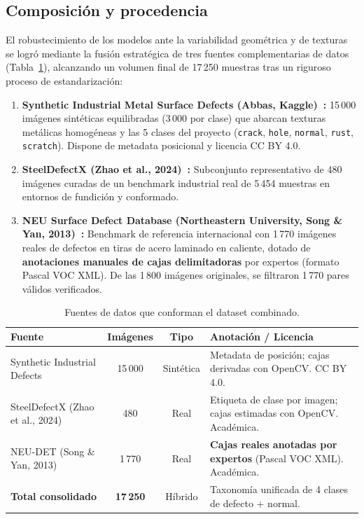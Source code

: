 \documentclass[11pt,a4paper]{article}
\begin{document}
\subsection{Composición y procedencia}
El robustecimiento de los modelos ante la variabilidad geométrica y de texturas se
logró mediante la fusión estratégica de tres fuentes complementarias de datos
(Tabla~\ref{tab:datasets}), alcanzando un volumen final de 17\,250 muestras tras un
riguroso proceso de estandarización:
\begin{enumerate}[leftmargin=1.6em,itemsep=0.15em]
  \item \textbf{Synthetic Industrial Metal Surface Defects (Abbas, Kaggle)~\cite{kaggle}:}
  15\,000 imágenes sintéticas equilibradas (3\,000 por clase) que abarcan texturas
  metálicas homogéneas y las 5 clases del proyecto (\texttt{crack}, \texttt{hole},
  \texttt{normal}, \texttt{rust}, \texttt{scratch}). Dispone de metadata posicional y
  licencia CC BY 4.0.
  \item \textbf{SteelDefectX (Zhao et al., 2024)~\cite{steeldefectx}:}
  Subconjunto representativo de 480 imágenes curadas de un benchmark industrial real
  de 5\,454 muestras en entornos de fundición y conformado.
  \item \textbf{NEU Surface Defect Database (Northeastern University, Song \& Yan, 2013)~\cite{neudet}:}
  Benchmark de referencia internacional con 1\,770 imágenes reales de defectos en
  tiras de acero laminado en caliente, dotado de \textbf{anotaciones manuales de
  cajas delimitadoras} por expertos (formato Pascal VOC XML). De las 1\,800 imágenes
  originales, se filtraron 1\,770 pares válidos verificados.
\end{enumerate}

\begin{table}[H]
  \centering\small
  \caption{Fuentes de datos que conforman el dataset combinado.}
  \label{tab:datasets}
  \begin{tabularx}{\textwidth}{@{}l c c X@{}}
    \toprule
    \textbf{Fuente} & \textbf{Imágenes} & \textbf{Tipo} & \textbf{Anotación / Licencia} \\
    \midrule
    Synthetic Industrial Defects~\cite{kaggle}
      & 15\,000 & Sintética & Metadata de posición; cajas derivadas con OpenCV. CC BY 4.0. \\
    SteelDefectX (Zhao et al., 2024)~\cite{steeldefectx}
      & 480 & Real & Etiqueta de clase por imagen; cajas estimadas con OpenCV. Académica. \\
    NEU-DET (Song \& Yan, 2013)~\cite{neudet}
      & 1\,770 & Real & \textbf{Cajas reales anotadas por expertos} (Pascal VOC XML). Académica. \\
    \midrule
    \textbf{Total consolidado} & \textbf{17\,250} & Híbrido & Taxonomía unificada de 4 clases de defecto + normal. \\
    \bottomrule
  \end{tabularx}
\end{table}
\end{document}
